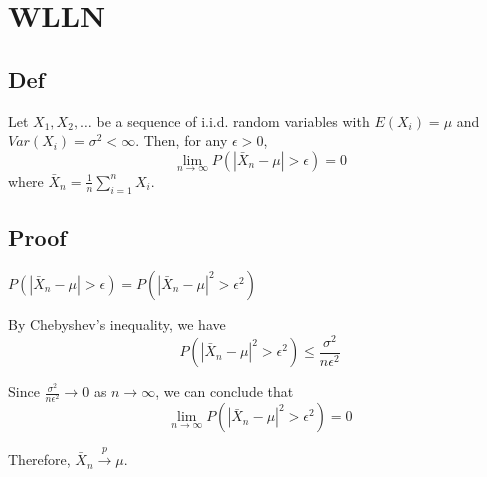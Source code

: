 \section{WLLN}
    \subsection*{Def}
        Let $X_1, X_2, \dots$ be a sequence of i.i.d. random variables with $E(X_i) = \mu$ and $Var(X_i) = \sigma^2 < \infty$. Then, for any $\epsilon > 0$,
        \[
            \lim_{n \to \infty} P(|\bar{X}_n - \mu| > \epsilon) = 0
        \]
        where $\bar{X}_n = \frac{1}{n} \sum_{i=1}^n X_i$.

    
    \subsection*{Proof}
        $P(|\bar{X}_n - \mu| > \epsilon) = P(|\bar{X}_n - \mu|^2 > \epsilon^2)$

        By Chebyshev's inequality, we have
        \[
        P(|\bar{X}_n - \mu|^2 > \epsilon^2) \leq \frac{\sigma^2}{n\epsilon^2}
        \]

        Since $\frac{\sigma^2}{n\epsilon^2} \to 0$ as $n \to \infty$, we can conclude that
        \[
        \lim_{n \to \infty} P(|\bar{X}_n - \mu|^2 > \epsilon^2) = 0
        \]

        Therefore, $\bar{X}_n \xrightarrow{p} \mu$.
        
            